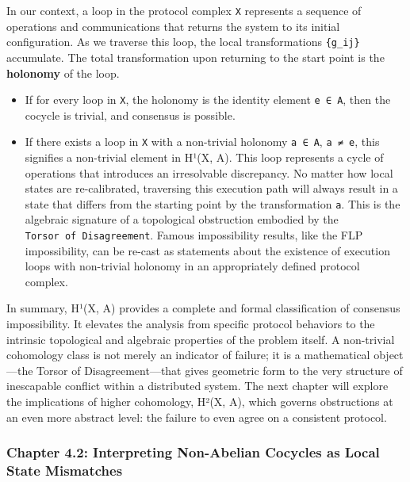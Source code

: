 \documentclass[
]{article}
\providecommand{\tightlist}{%
  \setlength{\itemsep}{0pt}\setlength{\parskip}{0pt}}
\begin{document}
In our context, a loop in the protocol complex \texttt{X} represents a
sequence of operations and communications that returns the system to its
initial configuration. As we traverse this loop, the local
transformations \texttt{\{g\_ij\}} accumulate. The total transformation
upon returning to the start point is the \textbf{holonomy} of the loop.

\begin{itemize}
\tightlist
\item
  If for every loop in \texttt{X}, the holonomy is the identity element
  \texttt{e\ ∈\ A}, then the cocycle is trivial, and consensus is
  possible.
\item
  If there exists a loop in \texttt{X} with a non-trivial holonomy
  \texttt{a\ ∈\ A}, \texttt{a\ ≠\ e}, this signifies a non-trivial
  element in H¹(X, A). This loop represents a cycle of operations that
  introduces an irresolvable discrepancy. No matter how local states are
  re-calibrated, traversing this execution path will always result in a
  state that differs from the starting point by the transformation
  \texttt{a}. This is the algebraic signature of a topological
  obstruction embodied by the \texttt{Torsor\ of\ Disagreement}. Famous
  impossibility results, like the FLP impossibility, can be re-cast as
  statements about the existence of execution loops with non-trivial
  holonomy in an appropriately defined protocol complex.
\end{itemize}

In summary, H¹(X, A) provides a complete and formal classification of
consensus impossibility. It elevates the analysis from specific protocol
behaviors to the intrinsic topological and algebraic properties of the
problem itself. A non-trivial cohomology class is not merely an
indicator of failure; it is a mathematical object---the Torsor of
Disagreement---that gives geometric form to the very structure of
inescapable conflict within a distributed system. The next chapter will
explore the implications of higher cohomology, H²(X, A), which governs
obstructions at an even more abstract level: the failure to even agree
on a consistent protocol.

\subsubsection{Chapter 4.2: Interpreting Non-Abelian Cocycles as Local
State
Mismatches}\label{chapter-4.2-interpreting-non-abelian-cocycles-as-local-state-mismatches}
\end{document}
